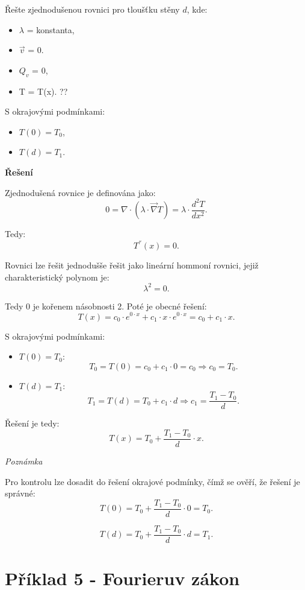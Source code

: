 \documentclass{article}
\begin{document}
Řešte zjednodušenou rovnici pro tloušťku stěny $d$, kde:

\begin{itemize}
    \item $\lambda$ = konstanta,
    \item $\vec{v}$ = 0.
    \item $Q_v$ = 0,
    \item T = T(x). ??
\end{itemize}

S okrajovými podmínkami:
\begin{itemize}
    \item $T(0) = T_0$,
    \item $T(d) = T_1$.
\end{itemize}

\textbf{Řešení}

Zjednodušená rovnice je definována jako:
$$
    0 = \nabla \cdot \left( \lambda \cdot \vec{\nabla} T \right) = \lambda \cdot \frac{d^2 T}{d x^2}.
$$

Tedy:
$$
    T^{''}(x) = 0.
$$

Rovnici lze řešit jednodušše řešit jako lineární hommoní rovnici, jejiž charakteristický polynom je:
$$
    \lambda^2 = 0.
$$

Tedy 0 je kořenem násobnosti 2. Poté je obecné řešení:
$$
    T(x) = c_0 \cdot e^{0 \cdot x} + c_1 \cdot x \cdot e^{0 \cdot x} = c_0 + c_1 \cdot x.
$$

S okrajovými podmínkami:
\begin{itemize}
    \item $T(0) = T_0$:
          $$
              T_0 = T(0) = c_0 + c_1 \cdot 0 = c_0 \Rightarrow c_0 = T_0.
          $$
    \item $T(d) = T_1$:
          $$
              T_1 = T(d) = T_0 + c_1 \cdot d \Rightarrow c_1 = \frac{T_1 - T_0}{d}.
          $$
\end{itemize}

Řešení je tedy:
$$
    T(x) = T_0 + \frac{T_1 - T_0}{d} \cdot x.
$$

\textit{Poznámka}

Pro kontrolu lze dosadit do řešení okrajové podmínky, čímž se ověří, že řešení je správné:
$$
    T(0) = T_0 + \frac{T_1 - T_0}{d} \cdot 0 = T_0.
$$

$$
    T(d) = T_0 + \frac{T_1 - T_0}{d} \cdot d = T_1.
$$



\section*{Příklad 5 - Fourieruv zákon}
\end{document}
